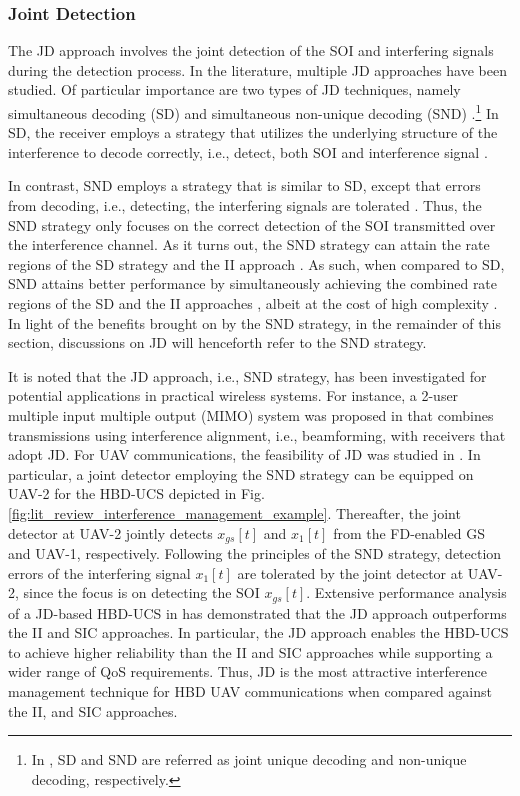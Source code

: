 \subsubsection{Joint Detection}
The JD approach involves the joint detection of the SOI and interfering signals during the detection process. In the literature, multiple JD approaches have been studied. Of particular importance are two types of JD techniques, namely simultaneous decoding (SD) \cite{bidokhti2014non, nam2014advanced, zhou2015mac} and simultaneous non-unique decoding (SND) \cite{bidokhti2014non, nam2014advanced, bandemer2012simultaneous}.\footnote{In \cite{bidokhti2014non}, SD and SND are referred as joint unique decoding and non-unique decoding, respectively.} In SD, the receiver employs a strategy that utilizes the underlying structure of the interference to decode correctly, i.e., detect, both SOI and interference signal \cite{bidokhti2014non, nam2014advanced, zhou2015mac, bandemer2012simultaneous}.

In contrast, SND employs a strategy that is similar to SD, except that errors from decoding, i.e., detecting, the interfering signals are tolerated \cite{bidokhti2014non, nam2014advanced, bandemer2012simultaneous}. Thus, the SND strategy only focuses on the correct detection of the SOI transmitted over the interference channel. As it turns out, the SND strategy can attain the rate regions of the SD strategy and the II approach \cite{nam2014advanced, bandemer2012simultaneous}. As such, when compared to SD, SND attains better performance by simultaneously achieving the combined rate regions of the SD and the II approaches \cite{nam2014advanced, bandemer2012simultaneous}, albeit at the cost of high complexity \cite{tan2018joint}. In light of the benefits brought on by the SND strategy, in the remainder of this section, discussions on JD will henceforth refer to the SND strategy.

It is noted that the JD approach, i.e., SND strategy, has been investigated for potential applications in practical wireless systems. For instance, a 2-user multiple input multiple output (MIMO) system was proposed in \cite{kim2019off} that combines transmissions using interference alignment, i.e., beamforming, with receivers that adopt JD. For UAV communications, the feasibility of JD was studied in \cite{tan2018joint}. In particular, a joint detector employing the SND strategy can be equipped on UAV-2 for the HBD-UCS depicted in Fig. \ref{fig:lit_review_interference_management_example}. Thereafter, the joint detector at UAV-2 jointly detects $x_{gs}[t]$ and $x_1[t]$ from the FD-enabled GS and UAV-1, respectively. Following the principles of the SND strategy, detection errors of the interfering signal $x_1[t]$ are tolerated by the joint detector at UAV-2, since the focus is on detecting the SOI $x_{gs}[t]$. Extensive performance analysis of a JD-based HBD-UCS in \cite{tan2018joint} has demonstrated that the JD approach outperforms the II and SIC approaches. In particular, the JD approach enables the HBD-UCS to achieve higher reliability than the II and SIC approaches while supporting a wider range of QoS requirements. Thus, JD is the most attractive interference management technique for HBD UAV communications when compared against the II, and SIC approaches.

